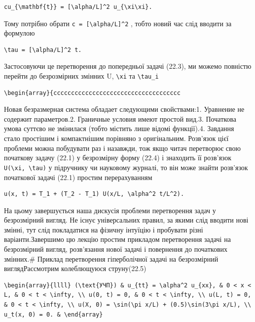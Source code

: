 \documentclass[
  ukrainian,
]{article}
\begin{document}
\begin{verbatim}
cu_{\mathbf{t}} = [\alpha/L]^2 u_{\xi\xi}.
\end{verbatim}

Тому потрібно обрати \texttt{c\ =\ {[}\textbackslash{}alpha/L{]}\^{}2} ,
тобто новий час слід вводити за формулою

\begin{verbatim}
\tau = [\alpha/L]^2 t.
\end{verbatim}

Застосовуючи це перетворення до попередньої задачі (22.3), ми можемо
повністю перейти до безрозмірних змінних U, \texttt{\textbackslash{}xi}
та \texttt{\textbackslash{}tau\_i}

\begin{verbatim}
\begin{array}{cccccccccccccccccccccccccccccccccccc
\end{verbatim}

Новая безразмерная система обладает следующими свойствами:1. Уравнение
не содержит параметров.2. Граничные условия имеют простой вид.3.
Початкова умова суттєво не змінилася (тобто містить лише відомі
функції).4. Завдання стало простішим і компактнішим порівняно з
оригінальним. Розв'язок цієї проблеми можна побудувати раз і назавжди,
тож якщо читач перетворює свою початкову задачу (22.1) у безрозмірну
форму (22.4) і знаходить її розв'язок
\texttt{U(\textbackslash{}xi,\ \textbackslash{}tau)} у підручнику чи
науковому журналі, то він може знайти розв'язок початкової задачі (22.1)
простим перерахуванням

\begin{verbatim}
u(x, t) = T_1 + (T_2 - T_1) U(x/L, \alpha^2 t/L^2).
\end{verbatim}

На цьому завершується наша дискусія проблеми перетворення задач у
безрозмірний вигляд. Не існує універсальних правил, за якими слід
вводити нові змінні, тут слід покладатися на фізичну інтуїцію і
пробувати різні варіанти.Завершимо цю лекцію простим прикладом
перетворення задачі на безрозмірний вигляд, розв'язання нової задачі і
повернення до початкових змінних.\# Приклад перетворення гіперболічної
задачі на безрозмірний виглядРассмотрим колеблющуюся струну(22.5)

\begin{verbatim}
\begin{array}{llll} (\text{УЧП}) & u_{tt} = \alpha^2 u_{xx}, & 0 < x < L, & 0 < t < \infty, \\ u(0, t) = 0, & 0 < t < \infty, \\ u(L, t) = 0, & 0 < t < \infty, \\ u(X, 0) = \sin(\pi x/L) + (0.5)\sin(3\pi x/L), \\ u_t(x, 0) = 0. & \end{array}
\end{verbatim}
\end{document}

